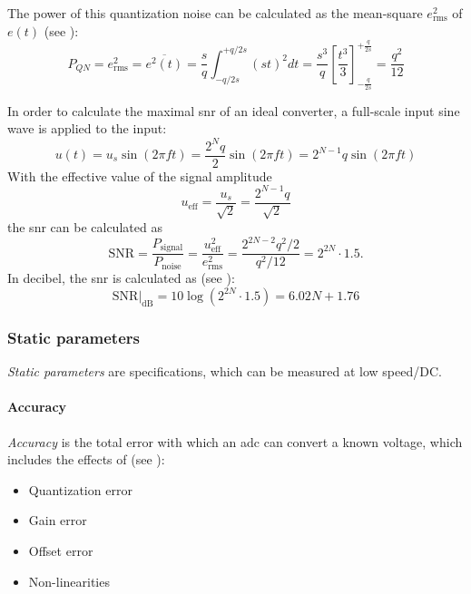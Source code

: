 The power of this quantization noise can be calculated as the mean-square $e_{\text{rms}}^2$ of $e(t)$ (see \cite{walt}):
\begin{equation}
	P_{QN} = e_{\text{rms}}^{2} = \overline{e^{2}(t)} = \frac{s}{q}\int_{-q/2s}^{+q/2s} (st)^{2} dt = \frac{s^3}{q} \left[ \frac{t^3}{3}\right]_{-\frac{q}{2s}}^{+\frac{q}{2s}} = \frac{q^2}{12}
\end{equation}

In order to calculate the maximal \gls{snr} of an ideal converter, a full-scale input sine wave is applied to the input:
\begin{equation}
	u(t) = u_s \sin(2\pi f t) = \frac{2^{N}q}{2}\sin(2\pi f t)  = 2^{N-1}q \sin(2\pi f t)
\end{equation}
With the effective value of the signal amplitude
\begin{equation}
	u_{\text{eff}} = \frac{u_s}{\sqrt{2}} = \frac{2^{N-1}q}{\sqrt{2}}
\end{equation}
the \gls{snr} can be calculated as 
\begin{equation}
	\text{SNR} = \frac{P_{\text{signal}}}{P_{\text{noise}}} = \frac{u_{\text{eff}}^{2}}{e_{\text{rms}}^{2}} = \frac{2^{2N-2}q^2/2}{q^2/12} = 2^{2N} \cdot 1.5.
\end{equation}
In decibel, the \gls{snr} is calculated as (see \cite{puente2015, walt}):
\begin{equation}\label{eq:idealSNR}
	\text{SNR}|_{\text{dB}} = 10\log\left(2^{2N}\cdot 1.5\right) = 6.02 N + 1.76
\end{equation}


\subsubsection{Static parameters}
\textit{Static parameters} are specifications, which can be measured at low speed/DC. 
\paragraph{Accuracy}
\textit{Accuracy} is the total error with which an \gls{adc} can convert a known voltage, which includes the effects of (see \cite{Lundberg}):
\begin{itemize}[noitemsep]
	\item Quantization error
	\item Gain error
	\item Offset error
	\item Non-linearities
\end{itemize}


